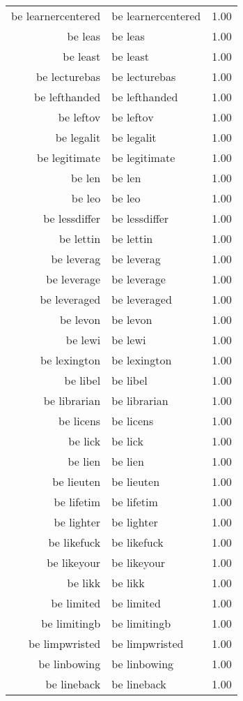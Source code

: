 \begin{table}[ht]
\begin{tabular}{rlr}
  be learnercentered & be learnercentered & 1.00 \\ 
  be leas & be leas & 1.00 \\ 
  be least & be least & 1.00 \\ 
  be lecturebas & be lecturebas & 1.00 \\ 
  be lefthanded & be lefthanded & 1.00 \\ 
  be leftov & be leftov & 1.00 \\ 
  be legalit & be legalit & 1.00 \\ 
  be legitimate & be legitimate & 1.00 \\ 
  be len & be len & 1.00 \\ 
  be leo & be leo & 1.00 \\ 
  be lessdiffer & be lessdiffer & 1.00 \\ 
  be lettin & be lettin & 1.00 \\ 
  be leverag & be leverag & 1.00 \\ 
  be leverage & be leverage & 1.00 \\ 
  be leveraged & be leveraged & 1.00 \\ 
  be levon & be levon & 1.00 \\ 
  be lewi & be lewi & 1.00 \\ 
  be lexington & be lexington & 1.00 \\ 
  be libel & be libel & 1.00 \\ 
  be librarian & be librarian & 1.00 \\ 
  be licens & be licens & 1.00 \\ 
  be lick & be lick & 1.00 \\ 
  be lien & be lien & 1.00 \\ 
  be lieuten & be lieuten & 1.00 \\ 
  be lifetim & be lifetim & 1.00 \\ 
  be lighter & be lighter & 1.00 \\ 
  be likefuck & be likefuck & 1.00 \\ 
  be likeyour & be likeyour & 1.00 \\ 
  be likk & be likk & 1.00 \\ 
  be limited & be limited & 1.00 \\ 
  be limitingb & be limitingb & 1.00 \\ 
  be limpwristed & be limpwristed & 1.00 \\ 
  be linbowing & be linbowing & 1.00 \\ 
  be lineback & be lineback & 1.00 \\ 

\end{tabular}
\end{table}
